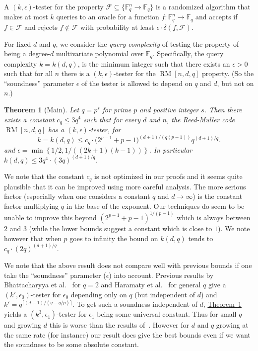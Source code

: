 \documentclass[10pt]{article}
\newtheorem{theorem}{Theorem}[section]
\theoremstyle{definition}
\numberwithin{equation}{section}
\newcommand{\expref}[2]{\texorpdfstring{\hyperref[#2]{#1~\ref{#2}}}{#1~\ref{#2}}}
\newcommand{\F}{{\mathbb{F}}}
\newcommand{\cF}{{\mathcal{F}}}
\newcommand{\set}[1]{\left\{{#1}\right\}}
\newcommand{\mrm}{\mathop{\mathrm{RM}}}
\begin{document}
A $(k,\epsilon)$-tester for the property $\cF \subseteq \{\F_q^n \to
\F_q\}$ is a randomized algorithm that makes at most $k$ queries to
an oracle for a function $f:\F_q^n \to \F_q$ and accepts if $f \in
\cF$ and rejects $f \not\in \cF$ with probability at least
$\epsilon \cdot \delta(f,\cF)$.

For fixed $d$ and $q$, we consider the \emph{query complexity} of
testing the property of being a %
degree-$d$ %
multivariate polynomial over $\F_q$.
Specifically, the query complexity $k = k(d,q)$, is the minimum
integer such that there exists an $\epsilon >0$ such that for all $n$
there is a $(k,\epsilon)$-tester for the $\mrm[n,d,q]$ property.
(So the ``soundness'' parameter $\epsilon$ of the tester is allowed to depend on $q$ and $d$, but
not on $n$.)
\setcounter{theorem}{0}
\begin{theorem}[Main]\label{thm:main-imp}
Let $q = p^s$ for prime $p$ and positive integer $s$.
Then there exists a constant $c_q \leq 3q^4$ such that for every
$d$ and $n$,
the Reed-Muller code $\mrm[n,d,q]$
has a $(k,\epsilon)$-tester, for 
\[k = k(d,q) \leq c_q \cdot  \big(2^{p-1}+p-1\big)^{ (d+1)/(q(p-1))} q^{(d+1)/q}.\]
and $\epsilon = \min\set{1/2, {1}/{((2k+1)(k-1))}    }$.
In particular $k(d,q) \leq 3q^4 \cdot (3q)^{(d+1)/q}$.
\end{theorem}



We note that the constant $c_q$ is not optimized in our proofs and
it seems quite plausible that it can be improved using more careful
analysis. The more serious factor (especially when one considers a
constant $q$ and $d \to \infty$) is the constant factor multiplying $q$
in the base of the exponent. Our techniques do seem to be unable
to improve this beyond $(2^{p-1}+p-1)^{1/(p-1)}$ which is always
between $2$ and $3$ (while the lower bounds suggest a constant
which is close to $1$). We note however that when $p$ goes to infinity the
bound on $k(d,q)$ tends to $c_q \cdot (2q)^{(d+1)/q}$.

We note  that the above result does not compare well with previous
bounds if one take the ``soundness'' parameter ($\epsilon$) into account. 
Previous results by Bhattacharyya et al.~\cite{BKSSZ} for $q=2$
and Haramaty et al.~\cite{HSS11} for general $q$ give a 
$(k',\epsilon_0)$-tester for $\epsilon_0$ depending only
on $q$ (but independent of $d$)
and $k' = q^{\lceil {(d+1)}/{(q - q/p)} \rceil}$. To get such a
soundness independent of $d$, \expref{Theorem}{thm:main-imp} yields
a $(k^3,\epsilon_1)$-tester for $\epsilon_1$ being some
universal constant. Thus for small $q$ and growing $d$ this is
worse than the results of~\cite{BKSSZ,HSS11}. However for $d$ and
$q$ growing at the same rate (for instance) our result does give
the best bounds even if we want the soundness to be some absolute
constant.
\end{document}
